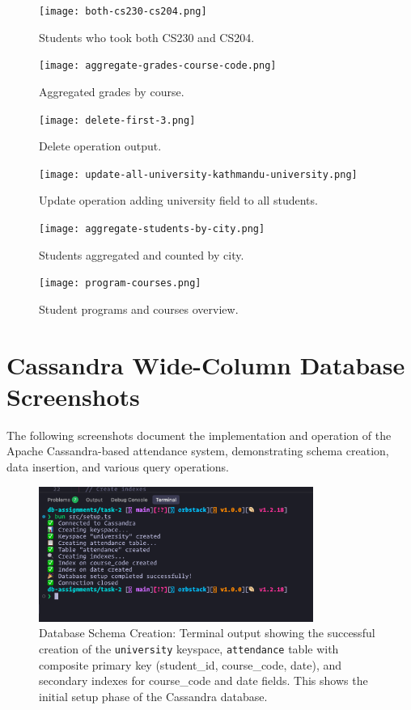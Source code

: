 \begin{figure}[H]
\centering
\texttt{[image: both-cs230-cs204.png]}
\caption{Students who took both CS230 and CS204.}
\label{fig:both-cs230-cs204}
\end{figure}

\begin{figure}[H]
\centering
\texttt{[image: aggregate-grades-course-code.png]}
\caption{Aggregated grades by course.}
\label{fig:aggregate-grades-course-code}
\end{figure}

\begin{figure}[H]
\centering
\texttt{[image: delete-first-3.png]}
\caption{Delete operation output.}
\label{fig:delete-first-3}
\end{figure}

\begin{figure}[H]
  \centering
  \texttt{[image: update-all-university-kathmandu-university.png]}
  \caption{Update operation adding university field to all students.}
  \label{fig:update-university}
\end{figure}

\begin{figure}[H]
  \centering
  \texttt{[image: aggregate-students-by-city.png]}
  \caption{Students aggregated and counted by city.}
  \label{fig:aggregate-students-city}
\end{figure}

\begin{figure}[H]
\centering
\texttt{[image: program-courses.png]}
\caption{Student programs and courses overview.}
\label{fig:program-courses}
\end{figure}

\section{Cassandra Wide-Column Database Screenshots}

The following screenshots document the implementation and operation of the Apache Cassandra-based attendance system, demonstrating schema creation, data insertion, and various query operations.

\begin{figure}[H]
  \centering
  \includegraphics[width=0.8\textwidth]{task-2/screenshots/create-database-and-tables.png}
  \caption{Database Schema Creation: Terminal output showing the successful creation of the \texttt{university} keyspace, \texttt{attendance} table with composite primary key (student\_id, course\_code, date), and secondary indexes for course\_code and date fields. This shows the initial setup phase of the Cassandra database.}
  \label{fig:task2-create-database}
\end{figure}

